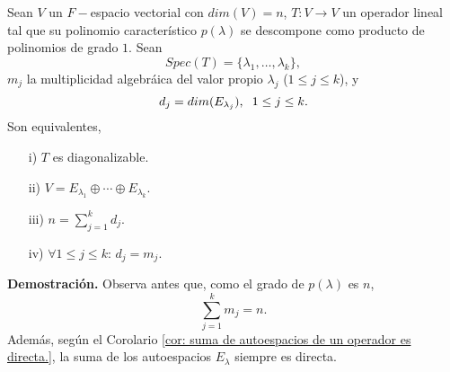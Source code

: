 \begin{teo}
	\label{teo: equivalencias a ser diagonalizable}
	Sean $V$ un $F-$espacio vectorial con $dim(V) = n$, 
	$T: V \longrightarrow V$ un operador lineal tal que 
	su polinomio característico $p(\lambda)$ se descompone como 
	producto de polinomios de grado $1$. 
	Sean
	\[
	Spec(T) = \{ \lambda_{1}, \ldots , \lambda_{k} \},
	\]
	$m_{j}$ la multiplicidad algebráica del valor propio
	$\lambda_{j}$ ($1 \leq j \leq k $), y
	\[
	d_{j} = dim(E_{\lambda_{j}}), \hspace{0.2cm} 1 \leq j \leq k.
	\]
	Son equivalentes,
	\begin{itemize}
		\item[i)] $T$ es diagonalizable.
		\item[ii)] $V = E_{\lambda_{1}} \oplus \cdots \oplus E_{\lambda_{k}}$.
		\item[iii)] $n = \sum_{j=1}^{k} d_{j}$. 
		\item[iv)] $\forall 1 \leq j \leq k$: $d_{j} = m_{j}$.
	\end{itemize}
\end{teo}
\textbf{Demostración.}
Observa antes que, como el grado de $p(\lambda)$ es $n$,
\begin{equation}
	\label{eq: equivalencias a ser diagonalizable 1}
	\sum_{j=1}^{k} m_{j} = n.
\end{equation}
Además, según el Corolario \ref{cor: suma de autoespacios de un operador es directa.},
la suma de los autoespacios $E_{\lambda}$ siempre es directa.
